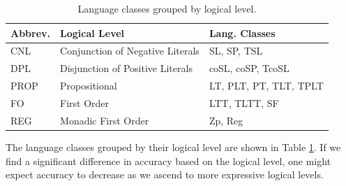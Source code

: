 \documentclass[twoside,11pt]{article}
\newcommand{\tbf}[1]{\textbf{#1}}
\begin{document}
\begin{table}[t]
    \centering
    \begin{tabular}{lll}
    \toprule
    \tbf{Abbrev.} & \tbf{Logical Level}              & \tbf{Lang. Classes}    \\
    \midrule
    CNL           & Conjunction of Negative Literals & SL, SP, TSL            \\
    DPL           & Disjunction of Positive Literals & coSL, coSP, TcoSL      \\
    PROP          & Propositional                    & LT, PLT, PT, TLT, TPLT \\
    FO            & First Order                      & LTT, TLTT, SF          \\
    REG           & Monadic First Order              & Zp, Reg                \\
    \bottomrule
    \end{tabular}
    \caption{Language classes grouped by logical level.}
    \label{tab:logical-level}
\end{table}

The language classes grouped by their logical level are shown in Table \ref{tab:logical-level}. If we find a significant difference in accuracy based on the logical level, one might expect accuracy to decrease as we ascend to more expressive logical levels.

\end{document}
